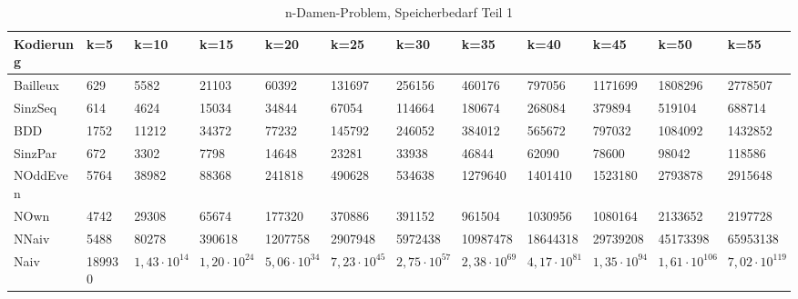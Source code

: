 \documentclass[a4,abstract=on]{scrartcl}
\begin{document}
\begin{landscape}
 \begin{table}[h!]
    \small
    \setlength{\tabcolsep}{0.11cm}
     \centering
     \begin{tabular}[width=\textwidth]{|l||l|l|l|l|l|l|l|l|l|l|l|}
	\hline
       \textbf{Kodierung}  & \textbf{k=5} & \textbf{k=10} & \textbf{k=15} &\textbf{k=20} &\textbf{k=25} &\textbf{k=30} &\textbf{k=35} &\textbf{k=40} &\textbf{k=45} &\textbf{k=50} &\textbf{k=55}\\
	\hline
	\hline
	Bailleux & 629 & 5582 & 21103 & 60392 & 131697 & 256156 & 460176 & 797056 & 1171699 & 1808296 & 2778507 \\
\hline
	SinzSeq & 614 & 4624 & 15034 & 34844 & 67054 & 114664 & 180674 & 268084 & 379894 & 519104 & 688714  \\
\hline
	BDD & 1752 & 11212 & 34372 & 77232 & 145792 & 246052 & 384012 &565672 &797032 &1084092 & 1432852 \\
\hline
	SinzPar & 672 & 3302 & 7798 & 14648 & 23281 & 33938 & 46844 & 62090 & 78600 & 98042 & 118586 \\
\hline
	NOddEven & 5764 & 38982 & 88368 & 241818 & 490628 & 534638 & 1279640 & 1401410 & 1523180 & 2793878 & 2915648\\
\hline
	NOwn & 4742 & 29308 & 65674 & 177320 & 370886 & 391152 & 961504 & 1030956 & 1080164 & 2133652 & 2197728 \\
 \hline
	NNaiv & 5488 & 80278 & 390618 & 1207758 & 2907948 & 5972438 & 10987478 & 18644318 & 29739208 & 45173398 & 65953138\\
\hline
	Naiv & 189930 & $1,43 \cdot 10^{14}$ &  $1,20 \cdot 10^{24}$ &  $5,06 \cdot 10^{34}$ & $7,23 \cdot 10^{45}$ &  $2,75 \cdot 10^{57}$ &  $2,38 \cdot 10^{69}$ &  $4,17 \cdot 10^{81}$ &  $1,35 \cdot 10^{94}$ &  $1,61 \cdot 10^{106}$ &  $7,02 \cdot 10^{119}$\\
\hline
       
     \end{tabular}

     \caption{n-Damen-Problem, Speicherbedarf Teil 1}
     \label{tbl:beispieltabelle}
\end{table}


\end{landscape}
\end{document}
